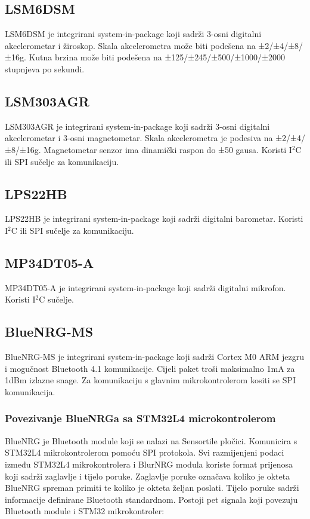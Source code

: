 \documentclass[times, utf8, diplomski]{diplomski}
\begin{document}
\subsection{LSM6DSM}
LSM6DSM \cite{LSM6DSM} je integrirani system-in-package koji sadrži 3-osni digitalni akcelerometar i žiroskop. Skala akcelerometra može biti podešena na ±2/±4/±8/±16g. Kutna brzina može biti podešena na
±125/±245/±500/±1000/±2000 stupnjeva po sekundi.

\subsection{LSM303AGR}
LSM303AGR je integrirani system-in-package koji sadrži 3-osni digitalni akcelerometar i 3-osni magnetometar. Skala akcelerometra je podesiva na
±2/±4/±8/±16g. Magnetometar senzor ima dinamički raspon do ±50 gausa. Koristi I\(^2\)C ili SPI sučelje za komunikaciju.

\subsection{LPS22HB}
LPS22HB je integrirani system-in-package koji sadrži digitalni barometar. Koristi I\(^2\)C ili SPI sučelje za komunikaciju.

\subsection{MP34DT05-A}
MP34DT05-A je integrirani system-in-package koji sadrži digitalni mikrofon. Koristi I\(^2\)C sučelje.

\subsection{BlueNRG-MS}
BlueNRG-MS \cite{BlueNrgMs} je integrirani system-in-package koji sadrži Cortex M0 ARM jezgru i mogučnost Bluetooth 4.1 komunikacije.
Cijeli paket troši maksimalno 1mA za 1dBm izlazne snage. Za komunikaciju s glavnim mikrokontrolerom kositi se SPI komunikacija.

\subsubsection{Povezivanje BlueNRGa sa STM32L4 microkontrolerom}
BlueNRG je Bluetooth module koji se nalazi na Sensortile pločici. Komunicira s STM32L4 mikrokontrolerom pomoću SPI protokola.
Svi razmijenjeni podaci između STM32L4 mikrokontrolera i BlurNRG modula koriste format prijenosa koji sadrži zaglavlje i tijelo poruke.
Zaglavlje poruke označava koliko je okteta BlueNRG spreman primiti te koliko je okteta željan poslati. Tijelo poruke sadrži informacije definirane Bluetooth standardnom.
Postoji pet signala koji povezuju Bluetooth module i STM32 mikrokontroler:
\end{document}
